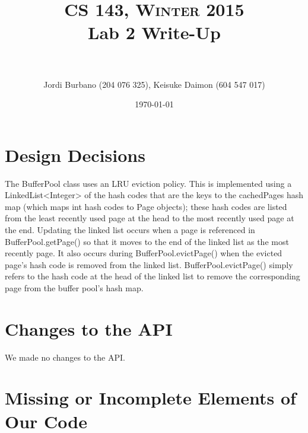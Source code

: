 \documentclass[paper=a4, fontsize=11pt]{scrartcl} %
\title{	
\normalfont \normalsize \textsc{CS 143, Winter 2015}
\horrule{0.5pt} \\[0.4cm] %
\huge Lab 2 Write-Up \\ %
\horrule{2pt} \\[0.5cm] %
}
\author{Jordi Burbano (204 076 325), Keisuke Daimon (604 547 017)} %
\date{\normalsize\today} %
\numberwithin{equation}{section} %
\numberwithin{figure}{section} %
\numberwithin{table}{section} %
\begin{document}
\maketitle %


\section{Design Decisions}

The BufferPool class uses an LRU eviction policy. This is implemented using a LinkedList<Integer> of the hash codes that are the keys to the cachedPages hash map (which maps int hash codes to Page objects); these hash codes are listed from the least recently used page at the head to the most recently used page at the end. Updating the linked list occurs when a page is referenced in BufferPool.getPage() so that it moves to the end of the linked list as the most recently page. It also occurs during BufferPool.evictPage() when the evicted page's hash code is removed from the linked list. BufferPool.evictPage() simply refers to the hash code at the head of the linked list to remove the corresponding page from the buffer pool's hash map.




\section{Changes to the API}

We made no changes to the API.




\section{Missing or Incomplete Elements of Our Code}
\end{document}
